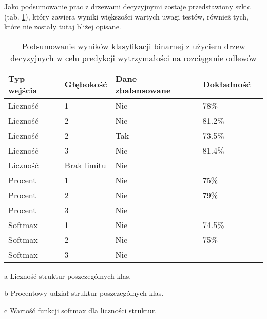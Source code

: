 Jako podsumowanie prac z drzewami decyzyjnymi zostaje przedstawiony szkic (tab. \ref{dt.binary.summary.table}), który zawiera wyniki większości wartych uwagi testów, również tych, które nie zostały tutaj bliżej opisane.
\begin{table}[h]
	\centering
	\begin{threeparttable}
		\caption{Podsumowanie wyników klasyfikacji binarnej z użyciem drzew decyzyjnych w celu predykcji wytrzymałości na rozciąganie odlewów}
		\label{dt.binary.summary.table}
		\begin{tabularx}{1\textwidth}{ |X|X|X|X|X| }
		  \hline
		  \textbf{Typ wejścia} & \textbf{Głębokość} & \textbf{Dane zbalansowane} & \textbf{Dokładność}\\

		  \hline
		  Liczność\tnote{a} & 1 & Nie  & 78\%\\

		  \hline
		   Liczność & 2 & Nie & 81.2\%\\

		  \hline
  		  Liczność & 2 & Tak & 73.5\%\\

		  \hline
		  Liczność & 3 & Nie & 81.4\%\\

		  \hline
		  Liczność & Brak limitu & Nie & \bo{84.3\%} \\

		\Xhline{3\arrayrulewidth}
  		  Procent\tnote{b} & 1 & Nie & 75\%\\
  		  
		  \hline
  		  Procent & 2 & Nie & 79\%\\
  		  
		  \hline
  		  Procent & 3 & Nie   & \bo{80\%} \\

          	\Xhline{3\arrayrulewidth}
  		  Softmax\tnote{c} & 1 & Nie   & 74.5\%\\

		  \hline
  		  Softmax & 2 & Nie   & 75\% \\

		  \hline
  		  Softmax & 3 & Nie   & \bo{78\%} \\

		  \hline
		\end{tabularx}
		\begin{tablenotes}
			\footnotesize
			\item[a] Liczność struktur poszczególnych klas.
			\item[b] Procentowy udział struktur poszczególnych klas.
			\item[c] Wartość funkcji softmax dla liczności struktur.
		\end{tablenotes}
	\end{threeparttable}
\end{table}
